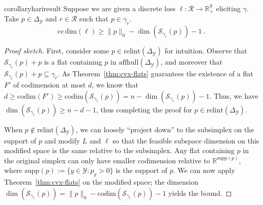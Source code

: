\documentclass{article}
\newcommand{\reals}{\mathbb{R}}
\newcommand{\simplex}{\Delta_\Y}
\newcommand{\relint}[1]{\mathrm{relint}(#1)}
\newcommand{\ccdim}{\mathrm{cc\,dim}}
\newcommand{\codim}{\mathrm{codim}}
\newcommand{\supp}{\mathrm{supp}}
\newcommand{\affhull}{\mathrm{affhull}}
\newcommand{\R}{\mathcal{R}}
\newcommand{\Sc}{\mathcal{S}}  %
\newcommand{\Y}{\mathcal{Y}}
\begin{document}
\begin{restatable}{corollary}{hariresult}\label{cor:fsd-bound}
	Suppose we are given a discrete loss $\ell:\R \to \reals^\Y_+$ eliciting $\gamma$.
	Take $p \in \simplex$ and $r \in \R$ such that $p \in \gamma_r$.
	\begin{equation}
	\ccdim(\ell) \geq \|p\|_0 - \dim(\Sc_{\gamma_r}(p)) - 1~.~
	\end{equation}
\end{restatable}
\begin{proof}[Proof sketch]
	First, consider some $p \in \relint{\simplex}$ for intuition.
	Observe that $\Sc_{\gamma_r}(p) + p$ is a flat containing $p$ in $\affhull(\simplex)$, and moreover that  $\Sc_{\gamma_r}(p) + p \subseteq \gamma_r$.
	As Theorem~\ref{thm:cvx-flats} guarantees the existence of a flat $F'$ of codimension at most $d$, we know that $d \geq \codim(F') \geq \codim(\Sc_{\gamma_r}(p)) = n- \dim(\Sc_{\gamma_r}(p)) - 1$.
	Thus, we have $\dim(\Sc_{\gamma_r}(p)) \geq n - d - 1$, thus completing the proof for $p \in \relint{\simplex}$.
	
	When $p \not \in \relint{\simplex}$, we can loosely ``project down'' to the subsimplex on the support of $p$ and modify $L$ and $\ell$ so that the feasible subspace dimension on this modified space is the same relative to the subsimplex.
	Any flat containing $p$ in the original simplex can only have smaller codimension relative to $\reals^{\supp(p)}$, where $\supp(p):=\{y\in\Y:p_y > 0\}$ is the support of $p$.
	We can now apply Theorem~\ref{thm:cvx-flats} on the modified space; the dimension $\dim(\Sc_{\gamma_r}(p)) = \|p\|_0 - \codim(\Sc_{\gamma_r}(p)) - 1$ yields the bound.
\end{proof}
\end{document}
